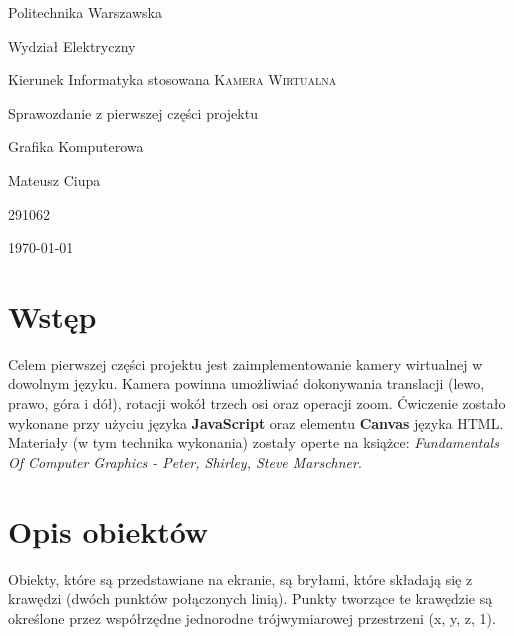 \documentclass{article}
\begin{document}
\begin{titlepage}
    
    \begin{center}
        \Large
            Politechnika Warszawska 
        
            Wydział Elektryczny 
        
            Kierunek Informatyka stosowana
        \vfill
        \Huge \textsc{Kamera Wirtualna}
        
        \Large 
            Sprawozdanie z pierwszej części projektu
        
            Grafika Komputerowa
    \end{center}
    \vfill



    \begin{center}
        \Large 
            Mateusz Ciupa
        
            291062
    \end{center}

    \begin{center}
        \Large	\today
    \end{center}

\end{titlepage}

\tableofcontents

\newpage

\section{Wstęp}

    Celem pierwszej części projektu jest zaimplementowanie kamery wirtualnej w dowolnym 
    języku. Kamera powinna umożliwiać dokonywania translacji (lewo, prawo, góra i dół), 
    rotacji wokół trzech osi oraz operacji zoom. Ćwiczenie zostało wykonane przy użyciu 
    języka \textbf{JavaScript} oraz elementu \textbf{Canvas} języka HTML. Materiały 
    (w tym technika wykonania) zostały operte na książce: \textit{Fundamentals Of Computer
    Graphics - Peter, Shirley, Steve Marschner}.

\section{Opis obiektów}

    Obiekty, które są przedstawiane na ekranie, są bryłami, które składają się z krawędzi
    (dwóch punktów połączonych linią). Punkty tworzące te krawędzie są określone przez
    współrzędne jednorodne trójwymiarowej przestrzeni (x, y, z, 1).
\end{document}
